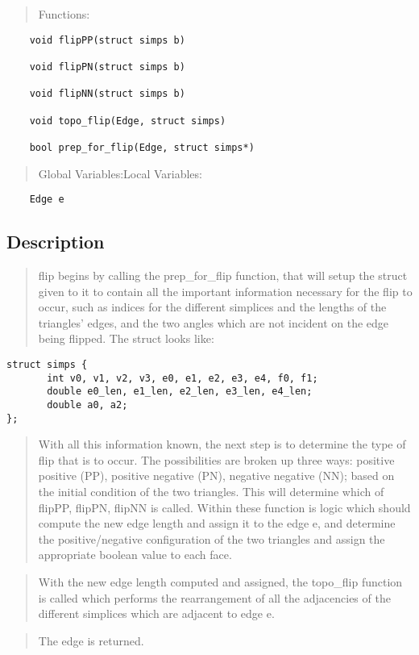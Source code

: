 \documentclass[10pt]{article}%
\begin{document}
\begin{quotation} Functions:\end{quotation}
{\small{\begin{verbatim} 
    void flipPP(struct simps b)

    void flipPN(struct simps b)

    void flipNN(struct simps b)

    void topo_flip(Edge, struct simps)

    bool prep_for_flip(Edge, struct simps*)
\end{verbatim}
}}
\begin{quotation} Global Variables:Local Variables:\end{quotation}
{\small{\begin{verbatim} 
    Edge e
\end{verbatim}
}}

\subsection*{Description}

\begin{quotation} flip begins by calling the prep\_for\_flip function, that will setup the struct given to it to contain all the important information necessary for the flip to occur, such as indices for the different simplices and the lengths of the triangles' edges, and the two angles which are not incident on the edge being flipped. The struct looks like:\end{quotation}{\small{\begin{verbatim} 
struct simps {
       int v0, v1, v2, v3, e0, e1, e2, e3, e4, f0, f1;
       double e0_len, e1_len, e2_len, e3_len, e4_len;
       double a0, a2;
};
\end{verbatim}
}}
\begin{quotation} With all this information known, the next step is to determine the type of flip that is to occur. The possibilities are broken up three ways: positive positive (PP), positive negative (PN), negative negative (NN); based on the initial condition of the two triangles. This will determine which of flipPP, flipPN, flipNN is called. Within these function is logic which should compute the new edge length and assign it to the edge e, and determine the positive/negative configuration of the two triangles and assign the appropriate boolean value to each face.\end{quotation}
\begin{quotation} With the new edge length computed and assigned, the topo\_flip function is called which performs the rearrangement of all the adjacencies of the different simplices which are adjacent to edge e.\end{quotation}
\begin{quotation} The edge is returned.\end{quotation}
\end{document}
